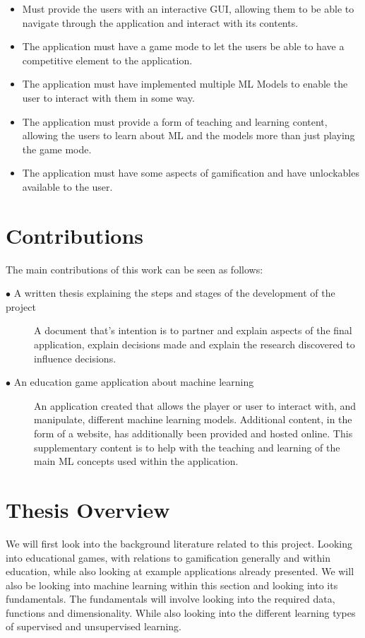 	\begin{itemize}
		\item Must provide the users with an interactive GUI, allowing them to be able to navigate through the application and interact with its contents.
		\item The application must have a game mode to let the users be able to have a competitive element to the application.
		\item The application must have implemented multiple ML Models to enable the user to interact with them in some way.
		\item The application must provide a form of teaching and learning content, allowing the users to learn about ML and the models more than just playing the game mode.
		\item The application must have some aspects of gamification and have unlockables available to the user.
	\end{itemize}
	
	
	\section{Contributions} 
		\label{sec:intro_contribs} 
		
		The main contributions of this work can be seen as follows:
		
		\begin{description}	
		
			\item[$\bullet$ A written thesis explaining the steps and stages of the development of the project]\hfill
			
			A document that's intention is to partner and explain aspects of the final application, explain decisions made and explain the research discovered to influence decisions.  
			
			\item[$\bullet$ An education game application about machine learning]\hfill
			
			An application created that allows the player or user to interact with, and manipulate, different machine learning models. Additional content, in the form of a website, has additionally been provided and hosted online. This supplementary content is to help with the teaching and learning of the main ML concepts used within the application.

		\end{description}
	
	\section{Thesis Overview}  
		\label{sec:intro_thesis_overview} 
		We will first look into the background literature related to this project. Looking into educational games, with relations to gamification generally and within education, while also looking at example applications already presented. We will also be looking into machine learning within this section and looking into its fundamentals. The fundamentals will involve looking into the required data, functions and dimensionality. While also looking into the different learning types of supervised and unsupervised learning.
		
